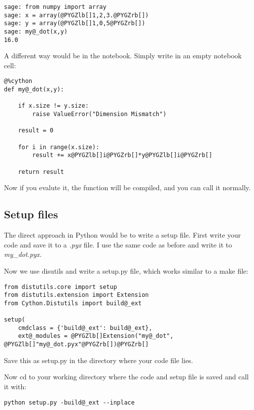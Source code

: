 \documentclass[letterpaper,10pt,english]{manual}
\begin{document}
\begin{Verbatim}[commandchars=@\[\]]
sage: from numpy import array
sage: x = array(@PYGZlb[]1,2,3.@PYGZrb[])
sage: y = array(@PYGZlb[]1,0,5@PYGZrb[])
sage: my@_dot(x,y)
16.0
\end{Verbatim}

A different way would be in the notebook. Simply write in an
empty notebook cell:

\begin{Verbatim}[commandchars=@\[\]]
@%cython
def my@_dot(x,y):

    if x.size != y.size:
        raise ValueError("Dimension Mismatch")

    result = 0

    for i in range(x.size):
        result += x@PYGZlb[]i@PYGZrb[]*y@PYGZlb[]i@PYGZrb[]

    return result
\end{Verbatim}

Now if you evalute it, the function will be compiled, and you can call
it normally.


\subsection{Setup files}

The direct approach in Python would be to write a setup file.
First write your code and save it to a \emph{.pyx} file. I use the
same code as before and write it to \emph{my\_dot.pyx}.

Now we use disutils and write a setup.py file, which works similar
to a make file:

\begin{Verbatim}[commandchars=@\[\]]
from distutils.core import setup
from distutils.extension import Extension
from Cython.Distutils import build@_ext

setup(
    cmdclass = {'build@_ext': build@_ext},
    ext@_modules = @PYGZlb[]Extension("my@_dot", @PYGZlb[]"my@_dot.pyx"@PYGZrb[])@PYGZrb[]
\end{Verbatim}

Save this as setup.py in the directory where your code file lies.

Now cd to your working directory where the code and setup file is
saved and call it with:

\begin{Verbatim}[commandchars=@\[\]]
python setup.py -build@_ext --inplace
\end{Verbatim}
\end{document}
